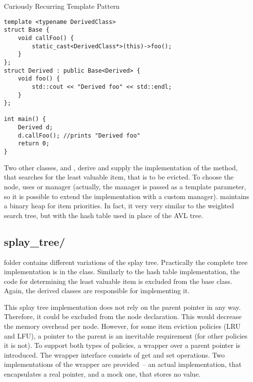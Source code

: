 \begin{listing}[t]
\caption{Curiously Recurring Template Pattern}
\label{lst:crtp}
\begin{verbatim}
template <typename DerivedClass>
struct Base {
    void callFoo() {
        static_cast<DerivedClass*>(this)->foo();
    }
};
struct Derived : public Base<Derived> {
    void foo() {
        std::cout << "Derived foo" << std::endl;
    }
};

int main() {
    Derived d;
    d.callFoo(); //prints "Derived foo"
    return 0;
}
\end{verbatim}
\end{listing}

Two other classes,  and , derive  and supply the implementation of the method, that searches for the least valuable item, that is to be evicted. To choose the node,  uses  or  manager (actually, the manager is passed as a template parameter, so it is possible to extend the implementation with a custom manager).  maintains a binary heap for item priorities. In fact, it very very similar to the weighted search tree, but with the hash table used in place of the AVL tree.

\subsection{splay\_tree/}
 folder contains different variations of the splay tree. Practically the complete tree implementation is in the  class. Similarly to the hash table implementation, the code for determining the least valuable item is excluded from the base class. Again, the derived classes are responsible for implementing it.

This splay tree implementation does not rely on the parent pointer in any way. Therefore, it could be excluded from the node declaration. This would decrease the memory overhead per node. However, for some item eviction policies (LRU and LFU), a pointer to the parent is an inevitable requirement (for other policies it is not). To support both types of policies, a wrapper over a parent pointer is introduced. The wrapper interface consists of get and set operations. Two implementations of the wrapper are provided~-- an actual implementation, that encapsulates a real pointer, and a mock one, that stores no value.

